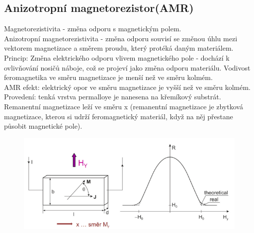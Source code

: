 \subsection{Anizotropní magnetorezistor(AMR)}
Magnetorezistivita - změna odporu s magnetickým polem.\\
Anizotropní magnetorezistivita - změna odporu souvisí se změnou úhlu mezi vektorem magnetizace a směrem proudu, který protéká daným materiálem.\\
Princip: Změna elektrického odporu vlivem magnetického pole - dochází k ovlivňování nosičů náboje, což se projeví jako změna odporu materiálu. Vodivost feromagnetika ve směru magnetizace je menší než ve směru kolmém.\\
AMR efekt: elektrický opor ve směru magnetizace je vyšší než ve směru kolmém.\\
Provedení: tenká vrstva permalloye je nanesena na křemíkový substrát.\\
Remanentní magnetizace leží ve směru x (remanentní magnetizace je zbytková magnetizace, kterou si udrží feromagnetický materiál, když na něj přestane působit magnetické pole).\\
\begin{figure}[h!]
    \centering
    \includegraphics[scale = 0.5]{images/AMR.png}
\end{figure}

